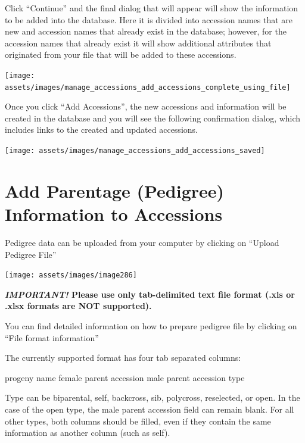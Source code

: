 \documentclass[
  12pt,
]{book}
\begin{document}
Click ``Continue'' and the final dialog that will appear will show the information to be added into the database. Here it is divided into accession names that are new and accession names that already exist in the database; however, for the accession names that already exist it will show additional attributes that originated from your file that will be added to these accessions.

\begin{center}\texttt{[image: assets/images/manage\_accessions\_add\_accessions\_complete\_using\_file]} \end{center}

Once you click ``Add Accessions'', the new accessions and information will be created in the database and you will see the following confirmation dialog, which includes links to the created and updated accessions.

\begin{center}\texttt{[image: assets/images/manage\_accessions\_add\_accessions\_saved]} \end{center}

\hypertarget{add-parentage-pedigree-information-to-accessions}{%
\section{Add Parentage (Pedigree) Information to Accessions}\label{add-parentage-pedigree-information-to-accessions}}

Pedigree data can be uploaded from your computer by clicking on ``Upload Pedigree File''

\begin{center}\texttt{[image: assets/images/image286]} \end{center}

\textbf{\emph{IMPORTANT!} Please use only tab-delimited text file format (.xls or .xlsx formats are NOT supported).}

You can find detailed information on how to prepare pedigree file by clicking on ``File format information''

The currently supported format has four tab separated columns:

progeny name female parent accession male parent accession type

Type can be biparental, self, backcross, sib, polycross, reselected, or open. In the case of the open type, the male parent accession field can remain blank. For all other types, both columns should be filled, even if they contain the same information as another column (such as self).
\end{document}
